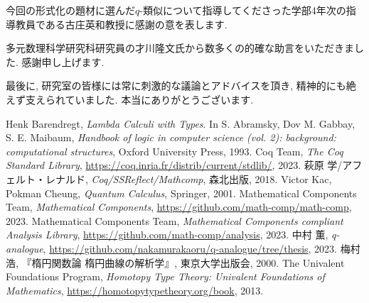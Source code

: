 \documentclass[11pt]{jsreport}
\theoremstyle{mystyle}
\newcommand{\0}{\textbf{0}}
\begin{document}
今回の形式化の題材に選んだ$q$-類似について指導してくださった学部4年次の指導教員である古庄英和教授に感謝の意を表します. 

多元数理科学研究科研究員の才川隆文氏から数多くの的確な助言をいただきました. 感謝申し上げます. 

最後に, 研究室の皆様には常に刺激的な議論とアドバイスを頂き, 精神的にも絶えず支えられていました. 本当にありがとうございます. 
\begin{thebibliography}{9}
   Henk Barendregt, {\it Lambda Calculi with Types}.  
    In S. Abramsky, Dov M. Gabbay, S. E. Maibaum, 
    {\it Handbook of logic in computer science (vol. 2): background:
     computational structures}, Oxford University Press, 1993.
   Coq Team, {\it The Coq Standard Library}, 
  \url{https://coq.inria.fr/distrib/current/stdlib/}, 2023.
   萩原 学/アフェルト・レナルド, {\it Coq/SSReflect/Mathcomp}, 森北出版, 
    2018.
   Victor Kac, Pokman Cheung, {\it{Quantum Calculus}}, Springer, 2001.
   Mathematical Components Team, {\it Mathematical Components}, \url{https://github.com/math-comp/math-comp}, 2023.
   Mathematical Components Team, 
  {\it Mathematical Components compliant Analysis Library}, 
  \url{https://github.com/math-comp/analysis}, 2023.
   中村 薫, {\it q-analogue}, \url{https://github.com/nakamurakaoru/q-analogue/tree/thesis}, 2023.
   梅村 浩, 『楕円関数論  楕円曲線の解析学』, 東京大学出版会, 2000.
   The Univalent Foundations Program, 
                      {\it{Homotopy Type Theory: Univalent Foundations of Mathematics}}, 
                      \url{https://homotopytypetheory.org/book}, 2013.
\end{thebibliography}
\end{document}
